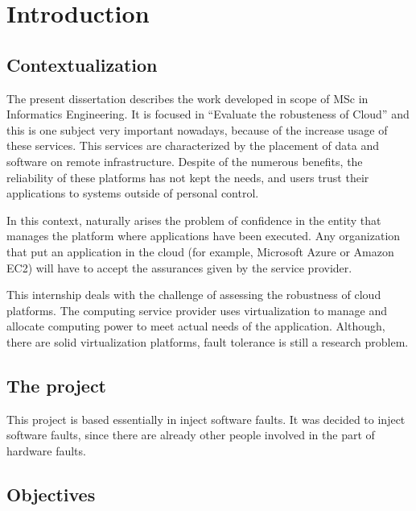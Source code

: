 \newpage
\section{Introduction}

\subsection{Contextualization}
The present dissertation describes the work developed in scope of MSc in Informatics Engineering. It is focused in ``Evaluate the robusteness of Cloud'' and this is one subject very important nowadays, because of the increase usage of these services.
This services are characterized by the placement of data and software on remote infrastructure. Despite of the numerous benefits, the reliability of these platforms has not kept the needs, and users trust their applications to systems outside of personal control. 

In this context, naturally arises the problem of confidence in the entity that manages the platform where applications have been executed. Any organization that put an application in the cloud (for example, Microsoft Azure or Amazon EC2) will have to accept the assurances given by the service provider.

This internship deals with the challenge of assessing the robustness of cloud platforms. The computing service provider uses virtualization to manage and allocate computing power to meet actual needs of the application. Although, there are solid virtualization platforms, fault tolerance is still a research problem.



\subsection{The project}

This project is based essentially in inject software faults. It was decided to inject software faults, since there are already other people involved in the part of hardware faults.

\subsection{Objectives}


